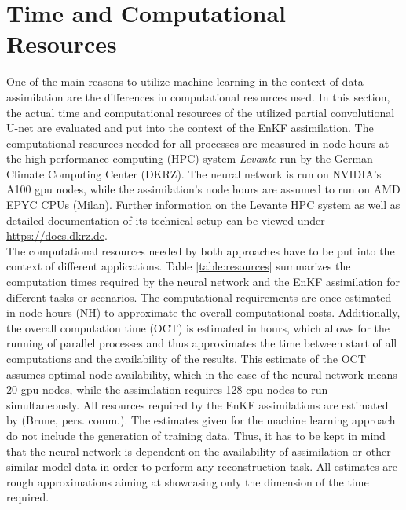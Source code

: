 \documentclass[Masterarbeit.tex]{subfile}
\begin{document}
	\section{Time and Computational Resources} \label{resources}
	
	One of the main reasons to utilize machine learning in the context of data assimilation are the differences in computational resources used. In this section, the actual time and computational resources of the utilized partial convolutional U-net are evaluated and put into the context of the EnKF assimilation. The computational resources needed for all processes are measured in node hours at the high performance computing (HPC) system \textit{Levante} run by the German Climate Computing Center (DKRZ). The neural network is run on NVIDIA's A100 gpu nodes, while the assimilation's node hours are assumed to run on AMD EPYC CPUs (Milan). Further information on the Levante HPC system as well as detailed documentation of its technical setup can be viewed under \url{https://docs.dkrz.de}.\\
	The computational resources needed by both approaches have to be put into the context of different applications. Table \ref{table:resources} summarizes the computation times required by the neural network and the EnKF assimilation for different tasks or scenarios. The computational requirements are once estimated in node hours (NH) to approximate the overall computational costs. Additionally, the overall computation time (OCT) is estimated in hours, which allows for the running of parallel processes and thus approximates the time between start of all computations and the availability of the results. This estimate of the OCT assumes optimal node availability, which in the case of the neural network means 20 gpu nodes, while the assimilation requires 128 cpu nodes to run simultaneously. All resources required by the EnKF assimilations are estimated by (Brune, pers. comm.). The estimates given for the machine learning approach do not include the generation of training data. Thus, it has to be kept in mind that the neural network is dependent on the availability of assimilation or other similar model data in order to perform any reconstruction task. All estimates are rough approximations aiming at showcasing only the dimension of the time required. \\
	
\end{document}
